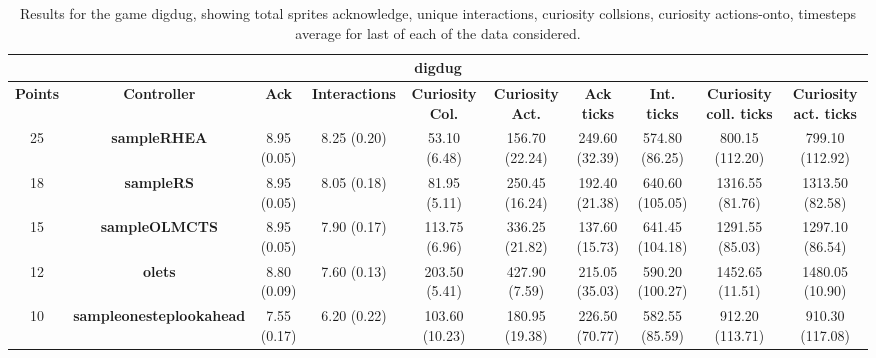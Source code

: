 \begin{table*}[!t]
\begin{center}
\begin{adjustbox}{width=1\textwidth}
\begin{tabular}{|c|c|c|c|c|c|c|c|c|c|}
\multicolumn{10}{c}{\textbf{digdug}}\\
\hline
\textbf{Points} & \textbf{Controller} & \textbf{Ack} & \textbf{Interactions} & \textbf{Curiosity Col.} & \textbf{Curiosity Act.} & \textbf{Ack ticks} & \textbf{Int. ticks} & \textbf{Curiosity coll. ticks} & \textbf{Curiosity act. ticks}\\
\hline
25 & \textbf{sampleRHEA} & 8.95 (0.05) & 8.25 (0.20) & 53.10 (6.48) & 156.70 (22.24) & 249.60 (32.39) & 574.80 (86.25) & 800.15 (112.20) & 799.10 (112.92)
 \\
\hline
18 & \textbf{sampleRS} & 8.95 (0.05) & 8.05 (0.18) & 81.95 (5.11) & 250.45 (16.24) & 192.40 (21.38) & 640.60 (105.05) & 1316.55 (81.76) & 1313.50 (82.58)
 \\
\hline
15 & \textbf{sampleOLMCTS} & 8.95 (0.05) & 7.90 (0.17) & 113.75 (6.96) & 336.25 (21.82) & 137.60 (15.73) & 641.45 (104.18) & 1291.55 (85.03) & 1297.10 (86.54)
 \\
\hline
12 & \textbf{olets} & 8.80 (0.09) & 7.60 (0.13) & 203.50 (5.41) & 427.90 (7.59) & 215.05 (35.03) & 590.20 (100.27) & 1452.65 (11.51) & 1480.05 (10.90)
 \\
\hline
10 & \textbf{sampleonesteplookahead} & 7.55 (0.17) & 6.20 (0.22) & 103.60 (10.23) & 180.95 (19.38) & 226.50 (70.77) & 582.55 (85.59) & 912.20 (113.71) & 910.30 (117.08)
 \\
\hline
\end{tabular}
\end{adjustbox}
\caption{Results for the game digdug, showing total sprites acknowledge, unique interactions, curiosity collsions, curiosity actions-onto, timesteps average for last of each of the data considered.}
\label{tab:weights}
\end{center}
\end{table*}
